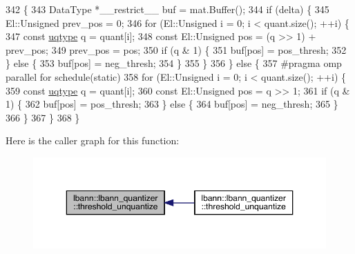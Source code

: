 \begin{DoxyCode}
342                                    \{
343   DataType *\_\_restrict\_\_ buf = mat.Buffer();
344   \textcolor{keywordflow}{if} (delta) \{
345     El::Unsigned prev\_pos = 0;
346     \textcolor{keywordflow}{for} (El::Unsigned i = 0; i < quant.size(); ++i) \{
347       \textcolor{keyword}{const} \hyperlink{classlbann_1_1lbann__quantizer_ac8b63c86fc871e248ce20c7af19a7fad}{uqtype} q = quant[i];
348       \textcolor{keyword}{const} El::Unsigned pos = (q >> 1) + prev\_pos;
349       prev\_pos = pos;
350       \textcolor{keywordflow}{if} (q & 1) \{
351         buf[pos] = pos\_thresh;
352       \} \textcolor{keywordflow}{else} \{
353         buf[pos] = neg\_thresh;
354       \}
355     \}
356   \} \textcolor{keywordflow}{else} \{
357 \textcolor{preprocessor}{    #pragma omp parallel for schedule(static)}
358     \textcolor{keywordflow}{for} (El::Unsigned i = 0; i < quant.size(); ++i) \{
359       \textcolor{keyword}{const} \hyperlink{classlbann_1_1lbann__quantizer_ac8b63c86fc871e248ce20c7af19a7fad}{uqtype} q = quant[i];
360       \textcolor{keyword}{const} El::Unsigned pos = q >> 1;
361       \textcolor{keywordflow}{if} (q & 1) \{
362         buf[pos] = pos\_thresh;
363       \} \textcolor{keywordflow}{else} \{
364         buf[pos] = neg\_thresh;
365       \}
366     \}
367   \}
368 \}
\end{DoxyCode}
Here is the caller graph for this function\+:\nopagebreak
\begin{figure}[H]
\begin{center}
\leavevmode
\includegraphics[width=350pt]{classlbann_1_1lbann__quantizer_a0f5f3b0149715ab59202b8884a87c7d5_icgraph}
\end{center}
\end{figure}
\mbox{\label{classlbann_1_1lbann__quantizer_a2324bba3cbb6c0d3e51bbe21555e7f1a}} 
